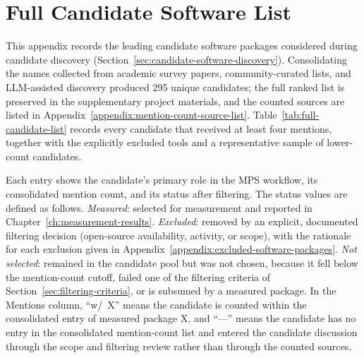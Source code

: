\chapter{Full Candidate Software List}
\label{appendix:full-candidate-software-list}

This appendix records the leading candidate software packages considered during candidate discovery (Section~\ref{sec:candidate-software-discovery}). Consolidating the names collected from academic survey papers, community-curated lists, and LLM-assisted discovery produced 295 unique candidates; the full ranked list is preserved in the supplementary project materials, and the counted sources are listed in Appendix~\ref{appendix:mention-count-source-list}. Table~\ref{tab:full-candidate-list} records every candidate that received at least four mentions, together with the explicitly excluded tools and a representative sample of lower-count candidates.

Each entry shows the candidate's primary role in the MPS workflow, its consolidated mention count, and its status after filtering. The status values are defined as follows. \textit{Measured}: selected for measurement and reported in Chapter~\ref{ch:measurement-results}. \textit{Excluded}: removed by an explicit, documented filtering decision (open-source availability, activity, or scope), with the rationale for each exclusion given in Appendix~\ref{appendix:excluded-software-packages}. \textit{Not selected}: remained in the candidate pool but was not chosen, because it fell below the mention-count cutoff, failed one of the filtering criteria of Section~\ref{sec:filtering-criteria}, or is subsumed by a measured package. In the Mentions column, ``w/~X'' means the candidate is counted within the consolidated entry of measured package X, and ``---'' means the candidate has no entry in the consolidated mention-count list and entered the candidate discussion through the scope and filtering review rather than through the counted sources.

